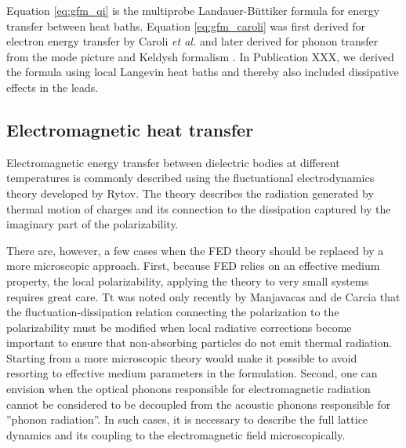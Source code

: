 Equation \eqref{eq:gfm_qi} is the multiprobe Landauer-B\"uttiker formula \cite{buttiker92} for energy transfer between heat baths. Equation \eqref{eq:gfm_caroli} was first derived for electron energy transfer by Caroli \textit{et al.} \cite{caroli71} and later derived for phonon transfer from the mode picture \cite{mingo06} and Keldysh formalism \cite{yamamoto06}. In Publication XXX, we derived the formula using local Langevin heat baths and thereby also included dissipative effects in the leads.

\subsection{Electromagnetic heat transfer}

Electromagnetic energy transfer between dielectric bodies at different temperatures is commonly described using the fluctuational electrodynamics theory developed by Rytov. The theory describes the radiation generated by thermal motion of charges and its connection to the dissipation captured by the imaginary part of the polarizability. 

There are, however, a few cases when the FED theory should be replaced by a more microscopic approach. First, because FED relies on an effective medium property, the local polarizability, applying the theory to very small systems requires great care. Tt was noted only recently by Manjavacas and de Carcia that the fluctuation-dissipation relation connecting the polarization to the polarizability must be modified when local radiative corrections become important to ensure that non-absorbing particles do not emit thermal radiation. Starting from a more microscopic theory would make it possible to avoid resorting to effective medium parameters in the formulation. Second, one can envision  when the optical phonons responsible for electromagnetic radiation cannot be considered to be decoupled from the acoustic phonons responsible for ''phonon radiation''. In such cases, it is necessary to describe the full lattice dynamics and its coupling to the electromagnetic field microscopically. 

